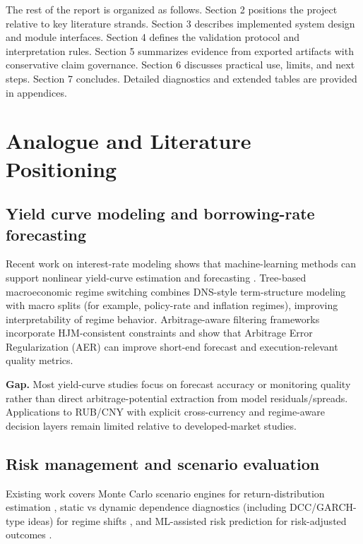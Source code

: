 \documentclass[a4paper,12pt]{extarticle}
\begin{document}
The rest of the report is organized as follows. Section 2 positions the project relative to key literature strands. Section 3 describes implemented system design and module interfaces. Section 4 defines the validation protocol and interpretation rules. Section 5 summarizes evidence from exported artifacts with conservative claim governance. Section 6 discusses practical use, limits, and next steps. Section 7 concludes. Detailed diagnostics and extended tables are provided in appendices.

\pagebreak

\section{Analogue and Literature Positioning}

\subsection{Yield curve modeling and borrowing-rate forecasting}

Recent work on interest-rate modeling shows that machine-learning methods can support nonlinear yield-curve estimation and forecasting \cite{delucchi2025, bluwstein2020}. Tree-based macroeconomic regime switching \cite{bie2025} combines DNS-style term-structure modeling with macro splits (for example, policy-rate and inflation regimes), improving interpretability of regime behavior. Arbitrage-aware filtering frameworks \cite{gao2025} incorporate HJM-consistent constraints and show that Arbitrage Error Regularization (AER) can improve short-end forecast and execution-relevant quality metrics.

\textbf{Gap.} Most yield-curve studies focus on forecast accuracy or monitoring quality rather than direct arbitrage-potential extraction from model residuals/spreads. Applications to RUB/CNY with explicit cross-currency and regime-aware decision layers remain limited relative to developed-market studies.

\subsection{Risk management and scenario evaluation}

Existing work covers Monte Carlo scenario engines for return-distribution estimation \cite{celestin2025}, static vs dynamic dependence diagnostics (including DCC/GARCH-type ideas) for regime shifts \cite{vasuki2025}, and ML-assisted risk prediction for risk-adjusted outcomes \cite{uddin2025}.
\end{document}
